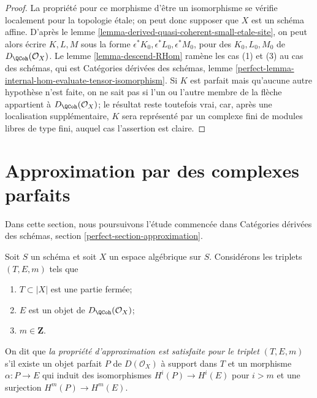 \begin{proof}
La propri\'et\'e pour ce morphisme d'\^etre un isomorphisme se v\'erifie
localement pour la topologie \'etale; on peut donc supposer que $X$ est un
sch\'ema affine. D'apr\`es le lemme
\ref{lemma-derived-quasi-coherent-small-etale-site}, on peut alors \'ecrire
$K,L,M$ sous la forme $\epsilon^*K_0,\epsilon^*L_0,\epsilon^*M_0$, pour des
$K_0,L_0,M_0$ de $D_\QCoh(\mathcal{O}_X)$. Le lemme
\ref{lemma-descend-RHom} ram\`ene les cas (1) et (3) au cas des sch\'emas,
qui est Cat\'egories d\'eriv\'ees des sch\'emas, lemme
\ref{perfect-lemma-internal-hom-evaluate-tensor-isomorphism}.
Si $K$ est parfait mais qu'aucune autre hypoth\`ese n'est faite, on ne sait pas
si l'un ou l'autre membre de la fl\`eche appartient \`a
$D_\QCoh(\mathcal{O}_X)$; le r\'esultat reste toutefois vrai, car, apr\`es une
localisation suppl\'ementaire, $K$ sera repr\'esent\'e par un complexe fini de
modules libres de type fini, auquel cas l'assertion est claire.
\end{proof}









\section{Approximation par des complexes parfaits}
\label{section-approximation}

\noindent
Dans cette section, nous poursuivons l'\'etude commenc\'ee dans Cat\'egories
d\'eriv\'ees des sch\'emas, section \ref{perfect-section-approximation}.

\begin{definition}
\label{definition-approximation-holds}
Soit $S$ un sch\'ema et soit $X$ un espace alg\'ebrique sur $S$.
Consid\'erons les triplets $(T,E,m)$ tels que
\begin{enumerate}
\item $T \subset |X|$ est une partie ferm\'ee;
\item $E$ est un objet de $D_\QCoh(\mathcal{O}_X)$;
\item $m \in \mathbf{Z}$.
\end{enumerate}
On dit que {\it la propri\'et\'e d'approximation est satisfaite pour le triplet}
$(T,E,m)$ s'il existe un objet parfait $P$ de $D(\mathcal{O}_X)$ \`a support
dans $T$ et un morphisme $\alpha : P \to E$ qui induit des isomorphismes
$H^i(P) \to H^i(E)$ pour $i>m$ et une surjection
$H^m(P) \to H^m(E)$.
\end{definition}

